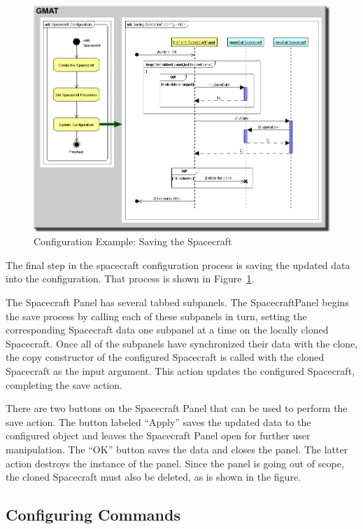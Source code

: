 \begin{figure}[htb]
\begin{center}
\includegraphics[450,342]{Images/SpacecraftSave.png}
\caption{\label{figure:SavingResource}Configuration Example: Saving the Spacecraft}
\end{center}
\end{figure}

The final step in the spacecraft configuration process is saving the updated data into the
configuration.  That process is shown in Figure~\ref{figure:SavingResource}.

The Spacecraft Panel has several tabbed subpanels.  The SpacecraftPanel begins the save process by
calling each of these subpanels in turn, setting the corresponding Spacecraft data one subpanel at a
time on the locally cloned Spacecraft.  Once all of the subpanels have synchronized their data with
the clone, the copy constructor of the configured Spacecraft is called with the cloned Spacecraft as
the input argument.  This action updates the configured Spacecraft, completing the save action.

There are two buttons on the Spacecraft Panel that can be used to perform the save action.  The
button labeled ``Apply'' saves the updated data to the configured object and leaves the Spacecraft
Panel open for further user manipulation.  The ``OK'' button saves the data and closes the panel.
The latter action destroys the instance of the panel.  Since the panel is going out of scope, the
cloned Spacecraft must also be deleted, as is shown in the figure.

\subsection{Configuring Commands}

